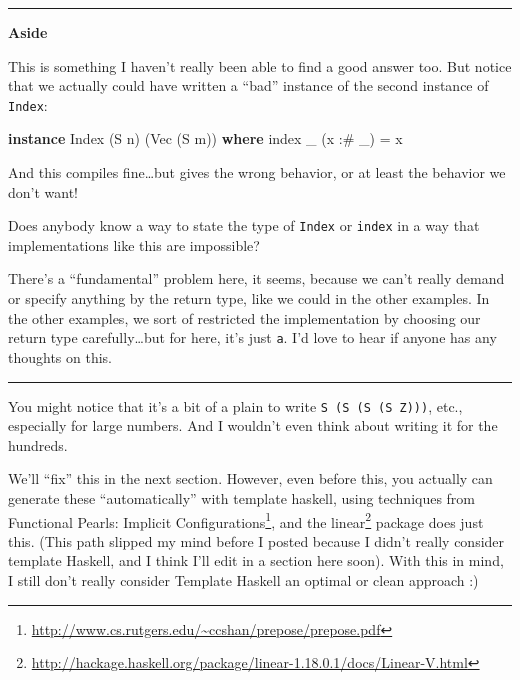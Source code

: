 \documentclass[]{article}
\newenvironment{Shaded}{\begin{snugshade}}{\end{snugshade}}
\newcommand{\DataTypeTok}[1]{\textcolor[rgb]{0.13,0.29,0.53}{#1}}
\newcommand{\FunctionTok}[1]{\textcolor[rgb]{0.00,0.00,0.00}{#1}}
\newcommand{\KeywordTok}[1]{\textcolor[rgb]{0.13,0.29,0.53}{\textbf{#1}}}
\newcommand{\NormalTok}[1]{#1}
\renewcommand{\href}[2]{#2\footnote{\url{#1}}}
\begin{document}
\begin{center}\rule{0.5\linewidth}{\linethickness}\end{center}

\textbf{Aside}

This is something I haven't really been able to find a good answer too. But
notice that we actually could have written a ``bad'' instance of the second
instance of \texttt{Index}:

\begin{Shaded}
\begin{Highlighting}[]
\KeywordTok{instance} \DataTypeTok{Index}\NormalTok{ (}\DataTypeTok{S}\NormalTok{ n) (}\DataTypeTok{Vec}\NormalTok{ (}\DataTypeTok{S}\NormalTok{ m)) }\KeywordTok{where}
\NormalTok{    index _ (x }\FunctionTok{:#}\NormalTok{ _) }\FunctionTok{=}\NormalTok{ x}
\end{Highlighting}
\end{Shaded}

And this compiles fine\ldots{}but gives the wrong behavior, or at least the
behavior we don't want!

Does anybody know a way to state the type of \texttt{Index} or \texttt{index} in
a way that implementations like this are impossible?

There's a ``fundamental'' problem here, it seems, because we can't really demand
or specify anything by the return type, like we could in the other examples. In
the other examples, we sort of restricted the implementation by choosing our
return type carefully\ldots{}but for here, it's just \texttt{a}. I'd love to
hear if anyone has any thoughts on this.

\begin{center}\rule{0.5\linewidth}{\linethickness}\end{center}

You might notice that it's a bit of a plain to write
\texttt{S\ (S\ (S\ (S\ Z)))}, etc., especially for large numbers. And I wouldn't
even think about writing it for the hundreds.

We'll ``fix'' this in the next section. However, even before this, you actually
can generate these ``automatically'' with template haskell, using techniques
from \href{http://www.cs.rutgers.edu/~ccshan/prepose/prepose.pdf}{Functional
Pearls: Implicit Configurations}, and the
\href{http://hackage.haskell.org/package/linear-1.18.0.1/docs/Linear-V.html}{linear}
package does just this. (This path slipped my mind before I posted because I
didn't really consider template Haskell, and I think I'll edit in a section here
soon). With this in mind, I still don't really consider Template Haskell an
optimal or clean approach :)
\end{document}
